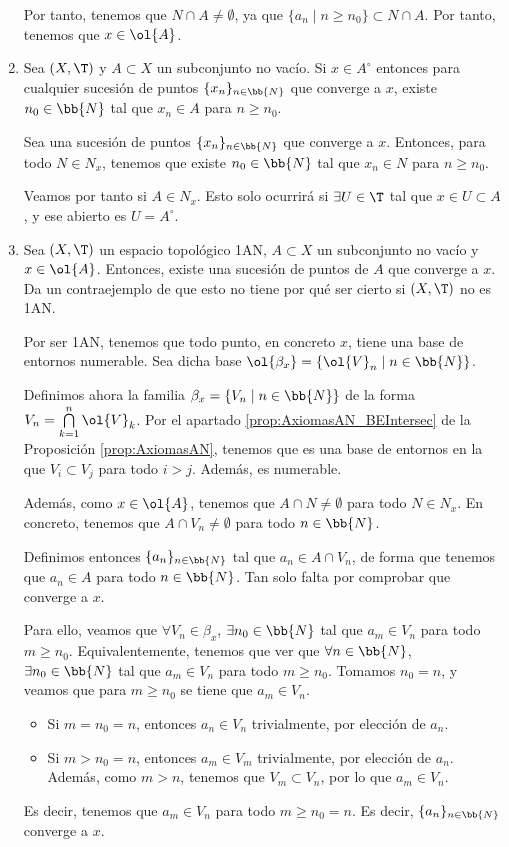 \begin{ejercicio}
\begin{enumerate}[label=\alph*)]
        Por tanto, tenemos que $N\cap A\neq \emptyset$, ya que $\{a_n\mid n\geq n_0\}\subset N\cap A$. Por tanto, tenemos que $x\in \ol{A}$.

        \item Sea $(X,\T)$ y $A\subset X$ un subconjunto no vacío. Si $x\in A^\circ$ entonces para cualquier sucesión de puntos $\{x_n\}_{n\in \bb{N}}$ que converge a $x$, existe $n_0\in \bb{N}$ tal que $x_n\in A$ para $n\geq n_0$.

        Sea una sucesión de puntos $\{x_n\}_{n\in \bb{N}}$ que converge a $x$. Entonces, para todo $N\in N_x$, tenemos que existe $n_0\in \bb{N}$ tal que $x_n\in N$ para $n\geq n_0$.

        Veamos por tanto si $A\in N_x$. Esto solo ocurrirá si $\exists U\in \T$ tal que $x\in U\subset A$, y ese abierto es $U=A^\circ$.

        \item Sea $(X,\T)$ un espacio topológico 1AN, $A\subset X$ un subconjunto no vacío y $x\in \ol{A}$. Entonces, existe una sucesión de puntos de $A$ que converge a $x$. Da un contraejemplo de que esto no tiene por qué ser cierto si $(X,\T)$ no es 1AN.

        Por ser 1AN, tenemos que todo punto, en concreto $x$, tiene una base de entornos numerable. Sea dicha base $\ol{\beta_x}=\{\ol{V}_n\mid n\in \bb{N}\}$.

        Definimos ahora la familia $\beta_x=\{V_n \mid n\in \bb{N}\}$ de la forma $V_n=\bigcap\limits_{k=1}^n \ol{V}_k$. Por el apartado \ref{prop:AxiomasAN_BEIntersec} de la Proposición \ref{prop:AxiomasAN}, tenemos que es una base de entornos en la que $V_i\subset V_j$ para todo $i>j$. Además, es numerable.        

        Además, como $x\in \ol{A}$, tenemos que $A\cap N\neq \emptyset$ para todo $N\in N_x$. En concreto, tenemos que $A\cap V_n\neq \emptyset$ para todo $n\in \bb{N}$.

        Definimos entonces $\{a_n\}_{n\in \bb{N}}$ tal que $a_n\in A\cap V_n$, de forma que tenemos que $a_n\in A$ para todo $n\in \bb{N}$. Tan solo falta por comprobar que converge a $x$.

        Para ello, veamos que $\forall V_n\in \beta_x$, $\exists n_0\in\bb{N}$ tal que $a_m\in V_n$ para todo $m\geq n_0$. Equivalentemente, tenemos que ver que $\forall n\in \bb{N}$, $\exists n_0\in \bb{N}$ tal que $a_m\in V_n$ para todo $m\geq n_0$. Tomamos $n_0=n$, y veamos que para $m\geq n_0$ se tiene que $a_m\in V_n$.
        \begin{itemize}
            \item Si $m=n_0=n$, entonces $a_n\in V_n$ trivialmente, por elección de $a_n$.
            \item Si $m>n_0=n$, entonces $a_m\in V_m$ trivialmente, por elección de $a_n$. Además, como $m>n$, tenemos que $V_m\subset V_n$, por lo que $a_m\in V_n$.
        \end{itemize}
        Es decir, tenemos que $a_m\in V_n$ para todo $m\geq n_0=n$. Es decir, $\{a_n\}_{n\in \bb{N}}$ converge a $x$.\\



\end{enumerate}
\end{ejercicio}
